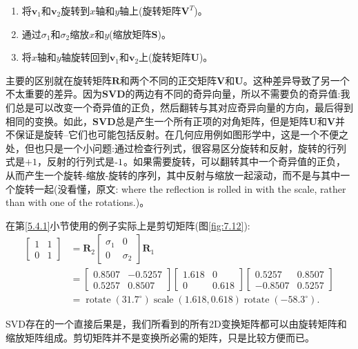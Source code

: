 \begin{enumerate}
	\item 将$\mathbf{v}_{1}$和$\mathbf{v}_{2}$旋转到$x$轴和$y$轴上(旋转矩阵$\mathbf{V}^{T}$)。
	
	\item 通过$\sigma_{1}$和$\sigma_{2}$缩放$x$和$y$(缩放矩阵$\mathbf{S}$)。
	
	\item 将$x$轴和$y$轴旋转回到$\mathbf{v}_{1}$和$\mathbf{v}_{2}$上(旋转矩阵$\mathbf{U}$)。
\end{enumerate}

主要的区别就在旋转矩阵$\mathbf{R}$和两个不同的正交矩阵$\mathbf{V}$和$\mathbf{U}$。这种差异导致了另一个不太重要的差异。因为$\mathbf{SVD}$的两边有不同的奇异向量，所以不需要负的奇异值:我们总是可以改变一个奇异值的正负，然后翻转与其对应奇异向量的方向，最后得到相同的变换。如此，$\mathbf{SVD}$总是产生一个所有正项的对角矩阵，但是矩阵$\mathbf{U}$和$\mathbf{V}$并不保证是旋转--它们也可能包括反射。在几何应用例如图形学中，这是一个不便之处，但也只是一个小问题:通过检查行列式，很容易区分旋转和反射，旋转的行列式是$+1$，反射的行列式是$\textnormal{-}1 $。如果需要旋转，可以翻转其中一个奇异值的正负，从而产生一个旋转-缩放-旋转的序列，其中反射与缩放一起滚动，而不是与其中一个旋转一起(没看懂，原文: where the reflection is
rolled in with the scale, rather than with one of the rotations.)。

\begin{example}在第\ref{5.4.1}小节使用的例子实际上是剪切矩阵(图\ref{fig:7.12}):
	\begin{equation}
		\begin{aligned}
			{\left[\begin{array}{ll}
					1 & 1 \\
					0 & 1
				\end{array}\right] } & =\mathbf{R}_2\left[\begin{array}{cc}
				\sigma_1 & 0 \\
				0 & \sigma_2
			\end{array}\right] \mathbf{R}_1 \\
			& =\left[\begin{array}{cc}
				0.8507 & -0.5257 \\
				0.5257 & 0.8507
			\end{array}\right]\left[\begin{array}{cc}
				1.618 & 0 \\
				0 & 0.618
			\end{array}\right]\left[\begin{array}{rr}
				0.5257 & 0.8507 \\
				-0.8507 & 0.5257
			\end{array}\right] \\
			& =\operatorname{rotate}\left(31.7^{\circ}\right) \operatorname{scale}(1.618,0.618) \operatorname{rotate}\left(-58.3^{\circ}\right) .
		\end{aligned}
	\nonumber
	\end{equation}
	
	SVD存在的一个直接后果是，我们所看到的所有2D变换矩阵都可以由旋转矩阵和缩放矩阵组成。剪切矩阵并不是变换所必需的矩阵，只是比较方便而已。
	
\end{example}

